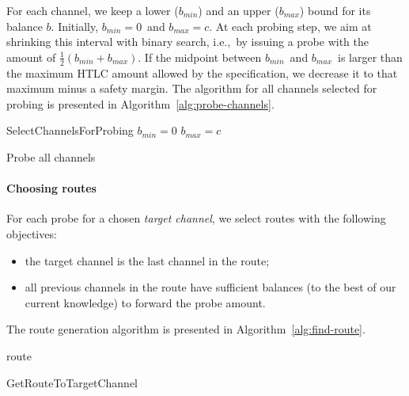 For each channel, we keep a lower ($b_{min}$) and an upper ($b_{max}$) bound for its balance $b$.
Initially, $b_{min}=0$~and $b_{max}=c$.
At each probing step, we aim at shrinking this interval with binary search, i.e.,~by issuing a probe with the amount of $\frac{1}{2} (b_{min} + b_{max})$.
If the midpoint between $b_{min}$~and $b_{max}$~is larger than the maximum HTLC amount allowed by the specification, we decrease it to that maximum minus a safety margin.
The algorithm for all channels selected for probing is presented in Algorithm~\ref{alg:probe-channels}.

\begin{algorithm}
	SelectChannelsForProbing\;
	 {	
		$b_{min} = 0$\;
		$b_{max} = c$\;
		 {
		}
	}
	\caption{Probe all channels}
	\label{alg:probe-channels}
\end{algorithm}


\paragraph{Choosing routes}

For each probe for a chosen \textit{target channel}, we select routes with the following objectives:
\begin{itemize}
	\item the target channel is the last channel in the route;
	\item all previous channels in the route have sufficient balances (to the best of our current knowledge) to forward the probe amount.
\end{itemize}

The route generation algorithm is presented in Algorithm~\ref{alg:find-route}.

\begin{algorithm}
	 {
	}
	\Return route\;
	\caption{GetRouteToTargetChannel}
	\label{alg:find-route}
\end{algorithm}

